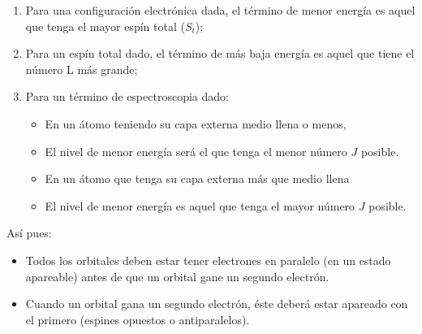 \begin{enumerate}
    \item Para una configuración electrónica dada, el término de menor energía es aquel que tenga el mayor espín total ($S_{t}$);
    \item Para un espín total dado, el término de más baja energía es aquel que tiene el número L más grande;
    \item Para un término de espectroscopia dado:
        \begin{itemize}
            \item En un átomo teniendo su capa externa medio llena o menos,
            \item El nivel de menor energía será el que tenga el menor número $J$ posible.
            \item En un átomo que tenga su capa externa más que medio llena
            \item El nivel de menor energía es aquel que tenga el mayor número $J$ posible.
        \end{itemize}
\end{enumerate}

Así pues:

\begin{itemize}
    \item Todos los orbitales deben estar tener electrones en paralelo (en un estado apareable) antes de que un orbital gane un segundo electrón.
    \item Cuando un orbital gana un segundo electrón, éste deberá estar apareado con el primero (espines opuestos o antiparalelos).
\end{itemize}